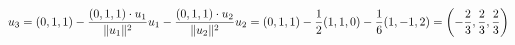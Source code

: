 \documentclass[preview]{standalone}
\begin{document}
\begin{align*}
\special{dvisvgm:raw <g id='unique000'>}u_3=(0,1,1)-\dfrac{(0,1,1)\cdot u_1}{\|u_1\|^2}u_1-\dfrac{(0,1,1)\cdot u_2}{\|u_2\|^2}u_2=(0,1,1)-\dfrac{1}{2}(1,1,0)-\dfrac{1}{6}(1,-1,2)=\left(-\dfrac{2}{3},\dfrac{2}{3},\dfrac{2}{3}\right)\special{dvisvgm:raw </g>}
\end{align*}
\end{document}
